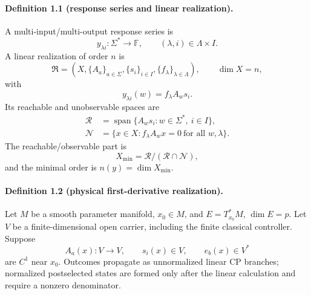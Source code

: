 \documentclass[aps,prl,onecolumn,superscriptaddress,nofootinbib]{revtex4-2}
\newcommand{\F}{\mathbb F}
\newcommand{\cN}{\mathcal N}
\newcommand{\cR}{\mathcal R}
\begin{document}
\paragraph{Definition 1.1 (response series and linear realization).}
A multi-input/multi-output response series is
\begin{equation}
 y_{\lambda i}:\Sigma^*\longrightarrow\F,
 \qquad (\lambda,i)\in\Lambda\times I.
 \label{eq:response-series}
\end{equation}
A linear realization of order $n$ is
\begin{equation}
 \mathfrak R=(X,\{A_a\}_{a\in\Sigma},\{s_i\}_{i\in I},
 \{f_\lambda\}_{\lambda\in\Lambda}),
 \qquad \dim X=n,
 \label{eq:linear-realization}
\end{equation}
with
\begin{equation}
 y_{\lambda i}(w)=f_\lambda A_ws_i.
 \label{eq:realization-output}
\end{equation}
Its reachable and unobservable spaces are
\begin{align}
 \cR&=\operatorname{span}\{A_ws_i:w\in\Sigma^*,\ i\in I\},\label{eq:reachable}\\
 \cN&=\{x\in X:f_\lambda A_wx=0\ \text{for all }w,\lambda\}.
 \label{eq:unobservable}
\end{align}
The reachable/observable part is
\begin{equation}
 X_{\min}=\cR/(\cR\cap\cN),
 \label{eq:minimal-quotient}
\end{equation}
and the minimal order is $n(y)=\dim X_{\min}$.

\paragraph{Definition 1.2 (physical first-derivative realization).}
Let $M$ be a smooth parameter manifold, $x_0\in M$, and $E=T^*_{x_0}M$, $\dim E=p$.  Let $V$ be a finite-dimensional open carrier, including the finite classical controller.  Suppose
\begin{equation}
 A_a(x):V\to V,
 \qquad s_i(x)\in V,
 \qquad e_b(x)\in V^*
 \label{eq:physical-data}
\end{equation}
are $C^1$ near $x_0$.  Outcomes propagate as unnormalized linear CP branches; normalized postselected states are formed only after the linear calculation and require a nonzero denominator.
\end{document}
